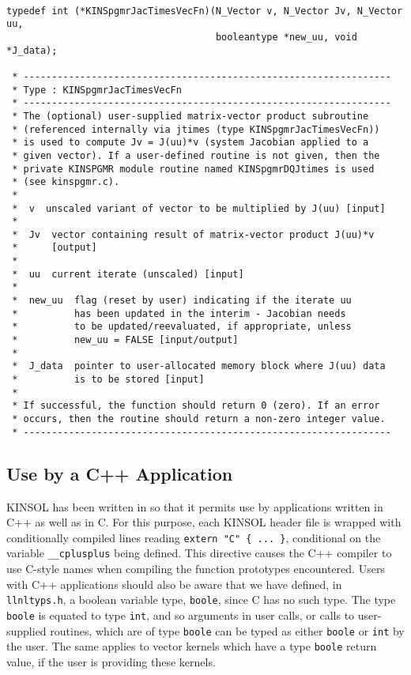 \documentclass[11pt]{article}
\begin{document}
\small
\begin{verbatim}

typedef int (*KINSpgmrJacTimesVecFn)(N_Vector v, N_Vector Jv, N_Vector uu,
                                     booleantype *new_uu, void *J_data);
  
 * -----------------------------------------------------------------
 * Type : KINSpgmrJacTimesVecFn
 * -----------------------------------------------------------------
 * The (optional) user-supplied matrix-vector product subroutine
 * (referenced internally via jtimes (type KINSpgmrJacTimesVecFn))
 * is used to compute Jv = J(uu)*v (system Jacobian applied to a
 * given vector). If a user-defined routine is not given, then the
 * private KINSPGMR module routine named KINSpgmrDQJtimes is used
 * (see kinspgmr.c).
 *
 *  v  unscaled variant of vector to be multiplied by J(uu) [input]
 *
 *  Jv  vector containing result of matrix-vector product J(uu)*v
 *      [output]
 *
 *  uu  current iterate (unscaled) [input]
 *
 *  new_uu  flag (reset by user) indicating if the iterate uu
 *          has been updated in the interim - Jacobian needs
 *          to be updated/reevaluated, if appropriate, unless
 *          new_uu = FALSE [input/output]
 *
 *  J_data  pointer to user-allocated memory block where J(uu) data
 *          is to be stored [input]
 *
 * If successful, the function should return 0 (zero). If an error
 * occurs, then the routine should return a non-zero integer value.
 * -----------------------------------------------------------------

\end{verbatim}
\normalsize
 
\subsection{Use by a C++ Application}

KINSOL has been written in so that it permits use by
applications written in C++ as well as in C.  For this purpose, each
KINSOL header file is wrapped with conditionally compiled lines reading
{\tt extern "C" \{ ... \}}, conditional on the variable 
{\tt \_\_cplusplus} being defined.  This directive causes the C++
compiler to use C-style names when compiling the function prototypes
encountered.  Users with C++ applications should also be aware that we
have defined, in {\tt llnltyps.h}, a boolean variable type, 
{\tt boole}, since C has no such type.  The type {\tt boole} is
equated to type {\tt int}, and so arguments in user calls, or calls to
user-supplied routines, which are of type {\tt boole} can be typed as
either {\tt boole} or {\tt int} by the user.  The same applies to
vector kernels which have a type {\tt boole} return value, if the user
is providing these kernels.
\end{document}
